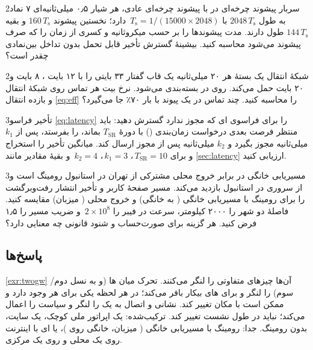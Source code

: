\documentclass[11pt,a4paper]{article}
\begin{document}
\begin{exercisebox}{2}{سربار پیشوند چرخه‌ای}\label{exr:cp}
در  با پیشوند چرخه‌ای عادی، هر شیار ۰٫۵ میلی‌ثانیه‌ای ۷ نماد  به طول
$2048\,T_\mathrm{s}$ با $T_\mathrm{s} = 1/(15000\times2048)$\, دارد؛ نخستین پیشوند
$160\,T_\mathrm{s}$ و بقیه $144\,T_\mathrm{s}$ طول دارند. مدت پیشوندها را بر حسب میکروثانیه و کسری از زمان
را که صرف پیشوند می‌شود محاسبه کنید. بیشینهٔ گسترش تأخیر قابل تحمل بدون تداخل بین‌نمادی چقدر است؟
\end{exercisebox}

\begin{exercisebox}{2}{شبکهٔ انتقال }\label{exr:volte}
یک بستهٔ  هر ۲۰ میلی‌ثانیه یک قاب گفتار ۳۳ بایتی را با ۱۲ بایت ، ۸ بایت  و
۲۰ بایت  حمل می‌کند. روی  در  بسته‌بندی می‌شود. نرخ بیت هر تماس روی
شبکهٔ انتقال و بازده انتقال \cref{eq:eff} را محاسبه کنید. چند تماس در یک پیوند  با بار
۷۰٪ جا می‌گیرد؟
\end{exercisebox}

\begin{exercisebox}{3}{تأخیر فراسو}\label{exr:ullat}
\cref{eq:latency} را برای فراسوی ای که مجوز ندارد گسترش دهید: باید منتظر فرصت بعدی درخواست
زمان‌بندی () با دورهٔ $T_{\mathrm{SR}}$ بماند،  را بفرستد، پس از $k_1$ میلی‌ثانیه مجوز
بگیرد و $k_2$ میلی‌ثانیه پس از مجوز ارسال کند. میانگین تأخیر را استخراج و برای $T_{\mathrm{SR}} = 10$\,،
$k_1 = 3$\,، $k_2 = 4$\, و بقیهٔ مقادیر مانند \cref{sec:latency} ارزیابی کنید.
\end{exercisebox}

\begin{exercisebox}{3}{مسیریابی خانگی در برابر خروج محلی}\label{exr:roaming}
مشترکی از تهران در استانبول رومینگ است و از سروری در استانبول بازدید می‌کند. مسیر صفحهٔ کاربر و تأخیر
انتشار رفت‌وبرگشت را برای رومینگ با مسیریابی خانگی ( به  خانگی) و خروج محلی (
میزبان) مقایسه کنید. فاصلهٔ دو شهر را ۲۰۰۰ کیلومتر، سرعت در فیبر را $2\times10^8$\, و ضریب مسیر را
۱٫۵ فرض کنید. هر گزینه برای صورت‌حساب و شنود قانونی چه معنایی دارد؟
\end{exercisebox}

\subsection*{پاسخ‌ها}

\begin{solutionbox}{\ref{exr:twogw}}
آن‌ها چیزهای متفاوتی را لنگر می‌کنند.  تحرک میان ها (و به نسل دوم/سوم) را لنگر و برای
های بیکار بافر می‌کند؛ در هر لحظه یکی برای هر  وجود دارد و ممکن است با مکان تغییر کند.
 نشانی  و اتصال به یک  را لنگر و سیاست را اعمال می‌کند؛ نباید در طول نشست تغییر
کند. ترکیب‌شده: یک اپراتور ملی کوچک، یک سایت، بدون رومینگ. جدا: رومینگ با مسیریابی خانگی (
میزبان،  خانگی روی )، یا ای با  اینترنت روی یک  محلی و 
 روی یک  مرکزی.
\end{solutionbox}
\end{document}

